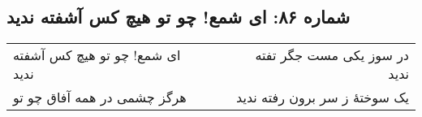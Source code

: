 \begin{center}
\section*{شماره ۸۶: ای شمع! چو تو هیچ کس آشفته ندید}
\label{sec:086}
\begin{longtable}{l p{0.5cm} r}
ای شمع! چو تو هیچ کس آشفته ندید
&&
در سوز یکی مست جگر تفته ندید
\\
هرگز چشمی در همه آفاق چو تو
&&
یک سوختهٔ ز سر برون رفته ندید
\\
\end{longtable}
\end{center}
